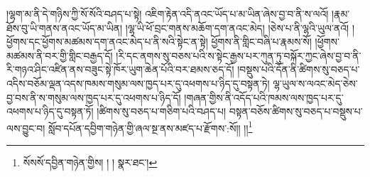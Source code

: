 །ལྷག་མ་ནི་དེ་གཉིས་ཀྱི་སོ་སོའི་བཤད་པ་སྟེ། འཇིག་རྟེན་འདི་ནའང་ཡོད་པ་མ་ཡིན་ཞེས་བྱ་བ་ནི་ས་ལའོ། །རྣམ་ཐོས་བུ་ཡི་གནས་ནའང་ཡོད་མ་ཡིན། །ལྷ་ཡི་ཕོ་བྲང་གནས་མཆོག་དག་ནའང་མེད། །ཅེས་པ་ནི་ལྷའི་ཡུལ་ནའོ། །ཕྱོགས་དང་ཕྱོགས་མཚམས་དག་ནའང་མེད་པ་ནི་སའི་སྟེང་ན་སྟེ། ཕྱོགས་ནི་གླིང་བཞི་པ་རྣམས་སོ། །ཕྱོགས་མཚམས་ནི་བར་གྱི་གླིང་བརྒྱད་དོ། །རི་དང་ནགས་སུ་བཅས་པའི་ས་སྟེང་རྒྱས་པར་ཀུན་ཏུ་བསྐོར་ཀྱང་ཞེས་བྱ་བ་ནི་རི་གཉའ་ཤིང་འཛིན་ནས་བཟུང་སྟེ་ཁོར་ཡུག་ཆེན་པོའི་བར་ཐམས་ཅད་དོ། །བསྡུས་པའི་དོན་ནི་ཚིགས་སུ་བཅད་པ་འདིས་བཅོམ་ལྡན་འདས་ཁམས་གསུམ་ལས་ཁྱད་པར་དུ་འཕགས་པ་ཉིད་དུ་བསྟན་ཏེ། ལྷ་ཡུལ་ས་ལའང་མེད་ཅེས་བྱ་བས་ནི་ས་གསུམ་ལས་ཁྱད་པར་དུ་འཕགས་པ་ཉིད་དོ། །གཞན་གྱིས་ནི་འདོད་པའི་ཁམས་ལས་ཁྱད་པར་དུ་འཕགས་པ་ཉིད་དུ་བསྟན་ཏོ། །ཚིགས་སུ་བཅད་པ་གཅིག་པའི་བཤད་པ། བསྟན་བཅོས་ཚིགས་སུ་བཅད་པ་བསྡུས་པ་ལས་བྱུང་བ། སློབ་དཔོན་དབྱིག་གཉེན་གྱི་ཞལ་སྔ་ནས་མཛད་པ་རྫོགས་:སོ།། །།\footnote{སོསསོ་དབྱིན་གཉེན་གྱིས། ། །  སྣར་ཐང་། }